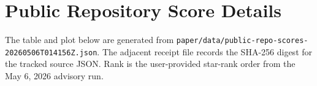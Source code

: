 \section{Public Repository Score Details}

The table and plot below are generated from \texttt{paper/data/public-repo-scores-20260506T014156Z.json}. The adjacent receipt file records the SHA-256 digest for the tracked source JSON. Rank is the user-provided star-rank order from the May 6, 2026 advisory run.

\PublicRepoScoreAppendixTable

\PublicRepoScoreAppendixPlot
